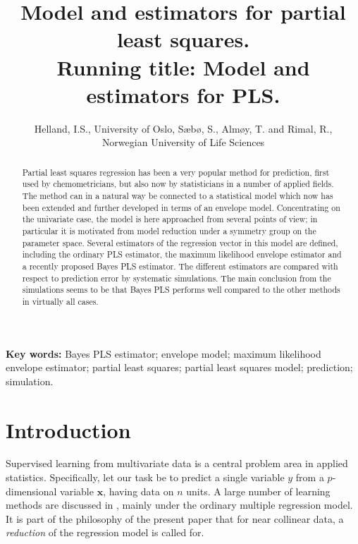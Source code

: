 \documentclass[a4paper, 11pt]{article}
\begin{document}
\title{Model and estimators for partial least squares.\\
  Running title: Model and estimators for PLS.}

\author{Helland, I.S., University of Oslo,  S\ae b\o , S., Alm\o y, T.  and Rimal, R.,\\
  Norwegian University of Life Sciences}

\maketitle

\begin{abstract}

Partial least squares regression has been a very popular method for prediction, first used by chemometricians, but also now by statisticians in a number of applied fields. The method can in a natural way be connected to a statistical model which now has been extended and further developed in terms of an envelope model. Concentrating on the univariate case, the model is here approached from several points of view; in particular it is motivated from model reduction under a symmetry group on the parameter space. Several estimators of the regression vector in this model are defined, including the ordinary PLS estimator, the maximum likelihood envelope estimator and a recently proposed Bayes PLS estimator. The different estimators are compared with respect to prediction error by systematic simulations. The main conclusion from the simulations seems to be that Bayes PLS performs well compared to the other methods in virtually all cases.

\end{abstract}

\textbf{Key words:} Bayes PLS estimator; envelope model; maximum likelihood envelope estimator; partial least squares; partial least squares model; prediction; simulation.


\section{Introduction}

Supervised learning from multivariate data is a central problem area in applied statistics. Specifically, let our task be to predict a single variable $y$ from a $p$-dimensional variable $\bm{x}$, having data on $n$ units. A large number of learning methods are discussed in \citet{hastie2009elements}, mainly under the ordinary multiple regression model. It is part of the philosophy of the present paper that for near collinear data, a \emph{reduction} of the regression model is called for.
\end{document}
